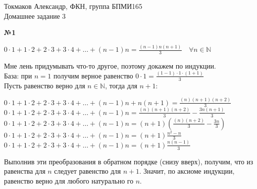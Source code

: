 \documentclass{article}
\newenvironment{task}{\begin{center}\fontsize{14}{14}\selectfont\bf}{\rm\fontsize{12}{12}\selectfont\end{center}}
\begin{document}
	\begin{center}
		Токмаков Александр, ФКН, группа БПМИ165 \\
		Домашнее задание 3
	\end{center}
	
	\begin{task} 
		№1
	\end{task}
	\begin{center}
		$0 \cdot 1 + 1\cdot 2 + 2\cdot 3 + 3\cdot4 + \dots + (n-1)n = \frac{(n-1)n(n+1)}{3} \quad \forall n\in \mathbb{N}$\\
	\end{center}
	Мне лень придумывать что-то другое, поэтому докажем по индукции. \\
	База: при $n=1$ получим верное равенство $0\cdot1 =\frac{(1-1)\cdot 1\cdot (1+1)}{3}$\\
	Пусть равенство верно для $n \in \mathbb{N}$, тогда для $n+1$:
	\begin{center}
		$0 \cdot 1 + 1\cdot 2 + 2\cdot 3 + 3\cdot4 + \dots + (n-1)n + n(n+1) = \frac{(n)(n+1)(n+2)}{3}$\\
		$0 \cdot 1 + 1\cdot 2 + 2\cdot 3 + 3\cdot4 + \dots + (n-1)n = \frac{(n)(n+1)(n+2)}{3} - \frac{3n(n+1)}{3}$\\
		$0 \cdot 1 + 1\cdot 2 + 2\cdot 3 + 3\cdot4 + \dots + (n-1)n = (n+1)\left( \frac{(n)(n+2)}{3} - \frac{3n}{3} \right)$\\
		$0 \cdot 1 + 1\cdot 2 + 2\cdot 3 + 3\cdot4 + \dots + (n-1)n = (n+1)\frac{n^2 - n}{3}$\\
		
		$0 \cdot 1 + 1\cdot 2 + 2\cdot 3 + 3\cdot4 + \dots + (n-1)n = (n+1)\frac{n(n-1)}{3}$\\
	\end{center} 
	Выполнив эти преобразования в обратном порядке (снизу вверх), получим, что из равенства для $n$ следует равенство для $n+1$. Значит, по аксиоме индукции, равенство верно для любого натурально
	го $n$.
	
\end{document}
